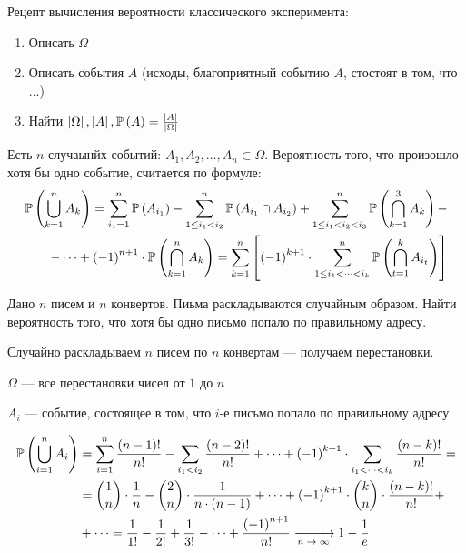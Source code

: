 Рецепт вычисления вероятности классического эксперимента:
\begin{enumerate}
\item Описать $\Omega$
\item Описать события $A$
    (исходы, благоприятный событию $A$, стостоят в том, что ...)
\item Найти $\left|\Omega\right|, \left|A\right|, \mathbb{P}\left( A \right)
    =\frac{\left|A\right|}{\left|\Omega\right|}$
\end{enumerate}
\begin{theorem}
Есть $n$ случаынйх событий: $A_1, A_2, \dots, A_n \subset \Omega$.
Вероятность того, что произошло хотя бы одно событие, считается по формуле:
\begin{align*}
\mathbb{P}\left( \bigcup_{k=1}^n A_k \right)=
\sum_{i_1=1}^n \mathbb{P}\left( A_{i_1} \right) -
\sum_{1\le i_1<i_2}^n \mathbb{P}\left( A_{i_1} \cap A_{i_2} \right)
+ \sum_{1\le i_1<i_2<i_3}^n \mathbb{P}\left( \bigcap_{k=1}^3 A_k \right) -\\
- \dots +
\left(-1\right)^{n+1} \cdot \mathbb{P}\left( \bigcap_{k=1}^n A_k \right) =
 \sum_{k=1}^n
    \left[ \left(-1\right)^{k+1} \cdot
        \sum_{1\le i_1<\dots<i_k}^n \mathbb{P}\left( \bigcap_{t=1}^k A_{i_t} \right)
    \right]
\end{align*}
\end{theorem}

\begin{example}
Дано $n$ писем и $n$ конвертов. Пиьма раскладываются случайным образом.
Найти вероятность того, что хотя бы одно письмо попало по правильному адресу.

Случайно раскладываем $n$ писем по $n$ конвертам --- получаем перестановки.

$\Omega$ --- все перестановки чисел от $1$ до $n$

$A_i$ --- событие, состоящее в том, что
$i$-е письмо попало по правильному адресу

\begin{align*}
\mathbb{P}\left( \bigcup_{i=1}^n A_i  \right) &=
\sum_{i=1}^n \frac{\left(n-1\right)!}{n!} -
\sum_{i_1<i_2} \frac{\left(n-2\right)!}{n!} + \dots +
\left(-1\right)^{k+1}\cdot
\sum_{i_1<\dots<i_k} \frac{\left(n-k\right)!}{n!}=\\
&=
\binom{1}{n}\cdot\frac{1}{n}-
\binom{2}{n}\cdot\frac{1}{n\cdot\left(n-1\right)}+\dots+
\left(-1\right)^{k+1} \cdot\binom{k}{n}\cdot\frac{\left(n-k\right)!}{n!}+\\
&+\dots =
\frac{1}{1!}-\frac{1}{2!}+\frac{1}{3!}-\dots+
\frac{\left(-1\right)^{n+1}}{n!}
\xrightarrow[\text{$n\to\infty$}]{} 1-\frac{1}{e}
\end{align*}
\end{example}

